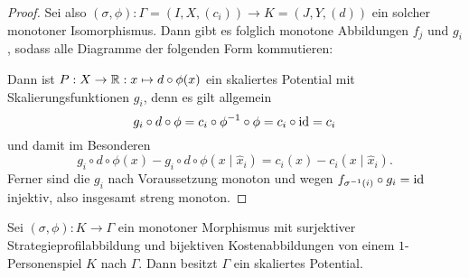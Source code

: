 \begin{proof}
	Sei also $(\sigma, \phi): \Gamma =(I, X, (c_i)) \to K = (J, Y, (d))$ ein solcher monotoner Isomorphismus. Dann gibt es folglich monotone Abbildungen $f_j$ und $g_i$, sodass alle Diagramme der folgenden Form kommutieren:
	
	\begin{center}
	\end{center}

	Dann ist $P: X \to \mathbb{R}: x \mapsto d \circ \phi(x)$ ein skaliertes Potential mit Skalierungsfunktionen $g_i$, denn es gilt allgemein
		\[g_i \circ d \circ \phi = c_i \circ \phi^{-1} \circ \phi = c_i \circ \mathrm{id} = c_i \]
	und damit im Besonderen
		\[g_i \circ d \circ \phi(x) - g_i \circ d \circ \phi(x \mid \hat{x}_i) = c_i(x) - c_i(x \mid \hat{x}_i) .\]
	Ferner sind die $g_i$ nach Voraussetzung monoton und wegen $f_{\sigma^{-1}(i)} \circ g_i = \mathrm{id}$ injektiv, also insgesamt streng monoton.
\end{proof}

\begin{kor}\label{kor:skalPotWennMon1PerMorph}
	Sei $(\sigma, \phi): K \to \Gamma$ ein monotoner Morphismus mit surjektiver Strategieprofilabbildung und bijektiven Kostenabbildungen von einem $1$-Personenspiel $K$ nach $\Gamma$. Dann besitzt $\Gamma$ ein skaliertes Potential.
\end{kor}

